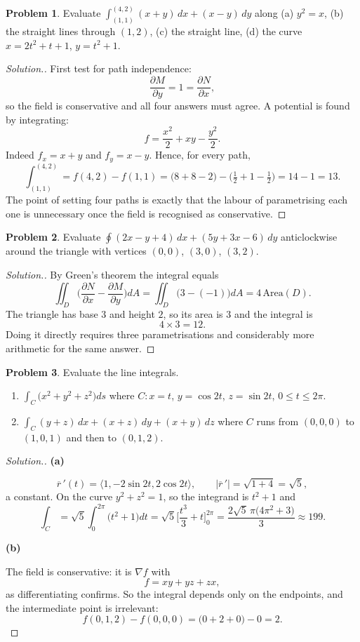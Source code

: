 \documentclass[11pt,a4paper]{article}
\theoremstyle{definition}
\newtheorem{problemx}{Problem}[subsection]
\newenvironment{problem}{\begin{problemx}}{\end{problemx}}
\newenvironment{solution}
  {\renewcommand{\qedsymbol}{}\begin{proof}[\textit{Solution}.]}
  {\end{proof}}
\newcommand{\subhead}[1]{%
  \par\medskip\noindent\textbf{#1}\par\nobreak\smallskip}
\begin{document}
\begin{problem}
Evaluate $\displaystyle{\int_{(1,1)}^{(4,2)}(x+y)\,dx + (x-y)\,dy}$ along
(a) $y^2 = x$, (b) the straight lines through $(1,2)$, (c) the straight line,
(d) the curve $x = 2t^2+t+1$, $y = t^2+1$.
\end{problem}
\begin{solution}
First test for path independence:
$$\frac{\partial M}{\partial y} = 1 = \frac{\partial N}{\partial x},$$
so the field is conservative and all four answers must agree. A potential is
found by integrating:
$$f = \frac{x^2}{2} + xy - \frac{y^2}{2}.$$
Indeed $f_x = x+y$ and $f_y = x-y$. Hence, for every path,
$$\int_{(1,1)}^{(4,2)} = f(4,2) - f(1,1)
= \Big(8+8-2\Big) - \Big(\tfrac12+1-\tfrac12\Big) = 14 - 1 = 13 .$$
The point of setting four paths is exactly that the labour of parametrising each
one is unnecessary once the field is recognised as conservative.
\end{solution}

\begin{problem}
Evaluate $\displaystyle{\oint(2x-y+4)\,dx + (5y+3x-6)\,dy}$ anticlockwise
around the triangle with vertices $(0,0)$, $(3,0)$, $(3,2)$.
\end{problem}
\begin{solution}
By Green's theorem the integral equals
$$\iint_D\Big(\frac{\partial N}{\partial x}-\frac{\partial M}{\partial y}\Big)dA
= \iint_D\big(3-(-1)\big)dA = 4\,\text{Area}(D).$$
The triangle has base $3$ and height $2$, so its area is $3$ and the integral is
$$4\times 3 = 12 .$$
Doing it directly requires three parametrisations and considerably more
arithmetic for the same answer.
\end{solution}

\begin{problem}
Evaluate the line integrals.
\begin{enumerate}
\item[(a)] $\displaystyle{\int_C\big(x^2+y^2+z^2\big)ds}$ where
$C: x=t$, $y=\cos 2t$, $z=\sin 2t$, $0\leq t\leq 2\pi$.
\item[(b)] $\displaystyle{\int_C(y+z)\,dx+(x+z)\,dy+(x+y)\,dz}$ where $C$ runs
from $(0,0,0)$ to $(1,0,1)$ and then to $(0,1,2)$.
\end{enumerate}
\end{problem}
\begin{solution}
\subhead{(a)}
$$\overline{r}\,'(t) = \langle 1, -2\sin 2t, 2\cos 2t\rangle,\qquad
\left|\overline{r}\,'\right| = \sqrt{1+4} = \sqrt5 ,$$
a constant. On the curve $y^2+z^2 = 1$, so the integrand is $t^2+1$ and
$$\int_C = \sqrt5\int_0^{2\pi}\big(t^2+1\big)dt
= \sqrt5\Big[\frac{t^3}{3}+t\Big]_0^{2\pi}
= \frac{2\sqrt5\,\pi\big(4\pi^2+3\big)}{3}\approx 199 .$$

\subhead{(b)}
The field is conservative: it is $\nabla f$ with
$$f = xy+yz+zx ,$$
as differentiating confirms. So the integral depends only on the endpoints,
and the intermediate point is irrelevant:
$$f(0,1,2) - f(0,0,0) = \big(0+2+0\big) - 0 = 2 .$$
\end{solution}
\end{document}
